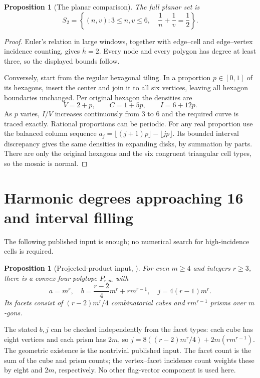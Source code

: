 \documentclass[11pt,a4paper]{article}
\newtheorem{proposition}[theorem]{Proposition}
\theoremstyle{definition}\newtheorem{definition}[theorem]{Definition}
\theoremstyle{remark}\newtheorem{remark}[theorem]{Remark}
\newcommand{\hbarM}{\overline h}\newcommand{\nbar}{\overline n}\newcommand{\vbar}{\overline v}
\begin{document}
\begin{proposition}[The planar comparison]\label{prop:planar}
The full planar set is
\[
 S_2=\left\{(n,v):3\le n,v\le6,\quad \frac1n+\frac1v=\frac12\right\}.
\]
\end{proposition}
\begin{proof}
Euler's relation in large windows, together with edge--cell and edge--vertex incidence counting, gives \(\hbarM=2\). Every node and every polygon has degree at least three, so the displayed bounds follow.

Conversely, start from the regular hexagonal tiling. In a proportion \(p\in[0,1]\) of its hexagons, insert the center and join it to all six vertices, leaving all hexagon boundaries unchanged. Per original hexagon the densities are
\[
 V=2+p,\qquad C=1+5p,\qquad I=6+12p.
\]
As \(p\) varies, \(I/V\) increases continuously from 3 to 6 and the required curve is traced exactly. Rational proportions can be periodic. For any real proportion use the balanced column sequence \(a_j=\lfloor(j+1)p\rfloor-\lfloor jp\rfloor\). Its bounded interval discrepancy gives the same densities in expanding disks, by summation by parts. There are only the original hexagons and the six congruent triangular cell types, so the mosaic is normal.
\end{proof}

\section{Harmonic degrees approaching 16 and interval filling}\label{sec:16}
The following published input is enough; no numerical search for high-incidence cells is required.

\begin{proposition}[Projected-product input, \citet{Z04}]\label{prop:product}
For even \(m\ge4\) and integers \(r\ge3\), there is a convex four-polytope \(P_{r,m}\) with
\begin{equation}\label{eq:productcounts}
 a=m^r,\quad b=\frac{r-2}{4}m^r+r m^{r-1},\quad
 j=4(r-1)m^r.
\end{equation}
Its facets consist of \((r-2)m^r/4\) combinatorial cubes and \(r m^{r-1}\) prisms over \(m\)-gons.
\end{proposition}
The stated \(b,j\) can be checked independently from the facet types: each cube has eight vertices and each prism has \(2m\), so \(j=8((r-2)m^r/4)+2m(rm^{r-1})\). The geometric existence is the nontrivial published input. The facet count is the sum of the cube and prism counts; the vertex--facet incidence count weights these by eight and \(2m\), respectively. No other flag-vector component is used here.
\end{document}
